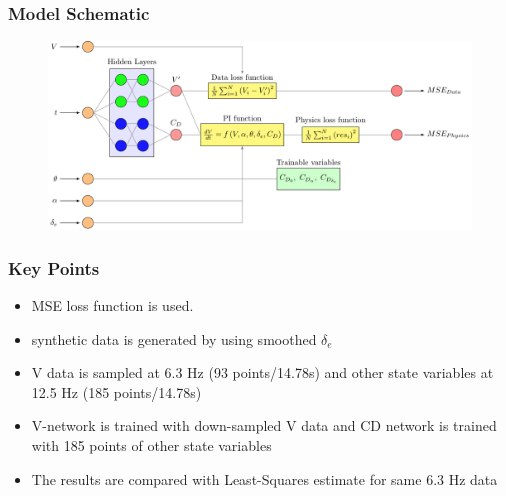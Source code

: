 \begin{frame}
	\frametitle{Model Schematic}
	\begin{figure}
		\includegraphics[scale=0.6]{01_schematic/SIPINN_schematic_V.pdf}
	\end{figure}
\end{frame}


\begin{frame}
	\frametitle{Key Points}
	\begin{itemize}
		\item MSE loss function is used.
			\vspace{0.75cm}
		\item synthetic data is generated by using smoothed \(\delta_e\)
			\vspace{0.75cm}
		\item V data is sampled at 6.3 Hz (93 points/14.78s) and other state variables at 12.5 Hz (185 points/14.78s)
			\vspace{0.75cm}
		\item V-network is trained with down-sampled V data and CD network is trained with 185 points of other state variables
			\vspace{0.75cm}
		\item The results are compared with Least-Squares estimate for same 6.3 Hz data
	\end{itemize}
\end{frame}

